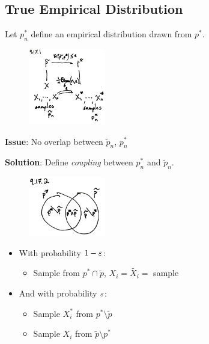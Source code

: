 \subsection{True Empirical Distribution}

Let $p_n^*$ define an empirical distribution drawn from $p^*$.

\begin{figure}[H]
\begin{center}
  \includegraphics[width=0.3\textwidth]{figures/9-17-1.png}
\end{center}
\end{figure}


\textbf{Issue}: No overlap between $\tilde{p}_n$, $p_n^*$

\textbf{Solution}: Define \emph{coupling} between $p_n^*$ and $\tilde{p}_n$.

\begin{figure}[H]
\begin{center}
  \includegraphics[width=0.3\textwidth]{figures/9-17-2.png}
\end{center}
\end{figure}

\begin{itemize}
  \item
    With probability $1 - \varepsilon$:
    \begin{itemize}
      \item Sample from $p^* \cap \tilde{p}$, $X_i = \tilde{X_i} =$ sample
    \end{itemize}
  \item
    And with probability $\varepsilon$:
    \begin{itemize}
      \item Sample $X_i^*$ from $p^* \setminus \tilde{p}$
      \item Sample $X_i$ from $\tilde{p} \setminus p^*$
    \end{itemize}
\end{itemize}

